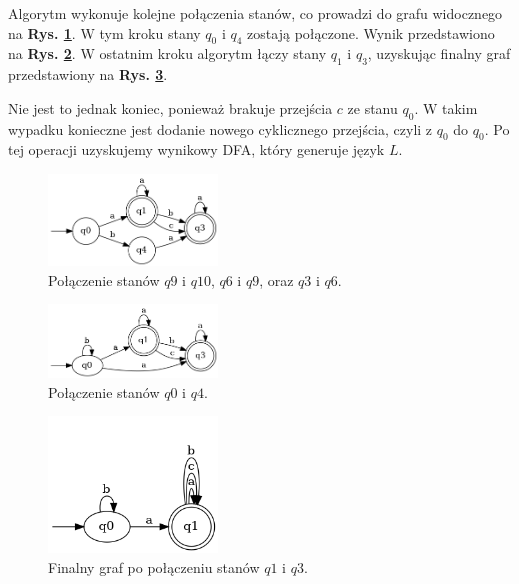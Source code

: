 Algorytm wykonuje kolejne połączenia stanów, co prowadzi do grafu widocznego na \textbf{Rys. \ref{fig:pta06}}. W tym kroku stany \( q_0 \) i \( q_4 \) zostają połączone. Wynik przedstawiono na \textbf{Rys. \ref{fig:pta07}}. W ostatnim kroku algorytm łączy stany \( q_1 \) i \( q_3 \), uzyskując finalny graf przedstawiony na \textbf{Rys. \ref{fig:pta08}}. 

Nie jest to jednak koniec, ponieważ brakuje przejścia \( c \) ze stanu \( q_0 \). W takim wypadku konieczne jest dodanie nowego cyklicznego przejścia, czyli z \( q_0 \) do \( q_0 \). Po tej operacji uzyskujemy wynikowy DFA, który generuje język \( L \).

\begin{figure}[ht]
    \centering
    \includegraphics[width=0.4\textwidth]{images/pta06.png}
    \caption{Połączenie stanów \( q9 \) i \( q10 \), \( q6 \) i \( q9 \), oraz \( q3 \) i \( q6 \).}
    \label{fig:pta06}
\end{figure}

\begin{figure}[ht]
    \centering
    \includegraphics[width=0.4\textwidth]{images/pta07.png}
    \caption{Połączenie stanów \( q0 \) i \( q4 \).}
    \label{fig:pta07}
\end{figure}

\begin{figure}[ht]
    \centering
    \includegraphics[width=0.4\textwidth]{images/pta08.png}
    \caption{Finalny graf po połączeniu stanów \( q1 \) i \( q3 \).}
    \label{fig:pta08}
\end{figure}
